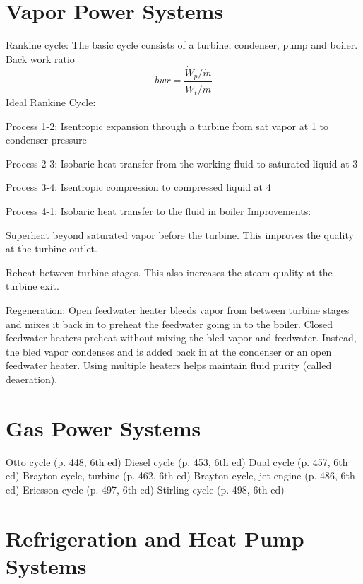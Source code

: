 \documentclass[paper=letter, fontsize=11pt]{scrartcl}
\numberwithin{equation}{section}        %
\numberwithin{figure}{section}          %
\numberwithin{table}{section}               %
\begin{document}
\newpage
\section{Vapor Power Systems}

Rankine cycle: The basic cycle consists of a turbine, condenser, pump and boiler.
\newline
\newline
Back work ratio
\begin{equation}
    bwr = \frac{\dot W_p/\dot m}{\dot W_t/\dot m}
\end{equation}
\newline
\newline
Ideal Rankine Cycle:

Process 1-2: Isentropic expansion through a turbine from sat vapor at 1 to condenser pressure

Process 2-3: Isobaric heat transfer from the working fluid to saturated liquid at 3

Process 3-4: Isentropic compression to compressed liquid at 4

Process 4-1: Isobaric heat transfer to the fluid in boiler
\newline
\newline
Improvements: 

Superheat beyond saturated vapor before the turbine. This improves the quality at the turbine outlet.

Reheat between turbine stages. This also increases the steam quality at the turbine exit.

Regeneration: Open feedwater heater bleeds vapor from between turbine stages and mixes it back in to preheat the feedwater going in to the boiler. Closed feedwater heaters preheat without mixing the bled vapor and feedwater. Instead, the bled vapor condenses and is added back in at the condenser or an open feedwater heater. Using multiple heaters helps maintain fluid purity (called deaeration).


\newpage
\section{Gas Power Systems}

Otto cycle (p. 448, 6th ed)
Diesel cycle (p. 453, 6th ed)
Dual cycle (p. 457, 6th ed)
Brayton cycle, turbine (p. 462, 6th ed)
Brayton cycle, jet engine (p. 486, 6th ed)
Ericsson cycle (p. 497, 6th ed)
Stirling cycle (p. 498, 6th ed)


\newpage
\section{Refrigeration and Heat Pump Systems}
\end{document}
